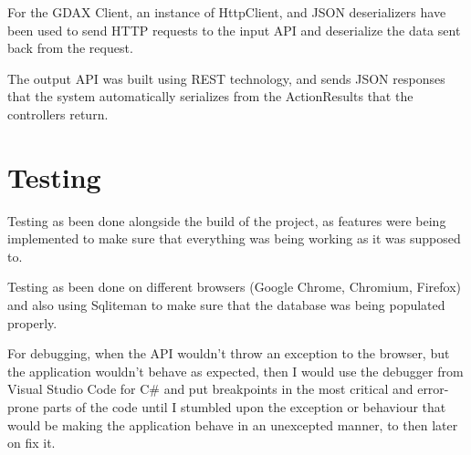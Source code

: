 \captionsetup{type=figure}


For the GDAX Client, an instance of HttpClient, and JSON deserializers have been used to send HTTP requests to the input API and deserialize the data sent back from the request.

The output API was built using REST technology, and sends JSON responses that the system automatically serializes from the ActionResults that the controllers return.
\section{Testing}
Testing as been done alongside the build of the project, as features were being implemented to make sure that everything was being working as it was supposed to.

Testing as been done on different browsers (Google Chrome, Chromium, Firefox) and also using Sqliteman to make sure that the database was being populated properly.

For debugging, when the API wouldn't throw an exception to the browser, but the application wouldn't behave as expected, then I would use the debugger from Visual Studio Code for C\# and put breakpoints in the most critical and error-prone parts of the code until I stumbled upon the exception or behaviour that would be making the application behave in an unexcepted manner, to then later on fix it.